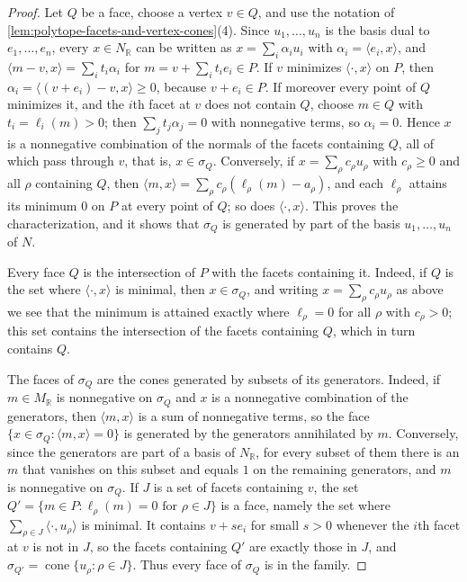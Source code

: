 \begin{proof}
Let $Q$ be a face, choose a vertex $v\in Q$, and use the notation of \cref{lem:polytope-facets-and-vertex-cones}(4). Since $u_1,\ldots,u_n$ is the basis dual to $e_1,\ldots,e_n$, every $x\in N_{\mathbb R}$ can be written as $x=\sum_i\alpha_iu_i$ with $\alpha_i=\langle e_i,x\rangle$, and $\langle m-v,x\rangle=\sum_it_i\alpha_i$ for $m=v+\sum_it_ie_i\in P$. If $v$ minimizes $\langle\cdot,x\rangle$ on $P$, then $\alpha_i=\langle(v+e_i)-v,x\rangle\geq0$, because $v+e_i\in P$. If moreover every point of $Q$ minimizes it, and the $i$th facet at $v$ does not contain $Q$, choose $m\in Q$ with $t_i=\ell_i(m)>0$; then $\sum_jt_j\alpha_j=0$ with nonnegative terms, so $\alpha_i=0$. Hence $x$ is a nonnegative combination of the normals of the facets containing $Q$, all of which pass through $v$, that is, $x\in\sigma_Q$. Conversely, if $x=\sum_\rho c_\rho u_\rho$ with $c_\rho\geq0$ and all $\rho$ containing $Q$, then $\langle m,x\rangle=\sum_\rho c_\rho(\ell_\rho(m)-a_\rho)$, and each $\ell_\rho$ attains its minimum $0$ on $P$ at every point of $Q$; so does $\langle\cdot,x\rangle$. This proves the characterization, and it shows that $\sigma_Q$ is generated by part of the basis $u_1,\ldots,u_n$ of $N$.

Every face $Q$ is the intersection of $P$ with the facets containing it. Indeed, if $Q$ is the set where $\langle\cdot,x\rangle$ is minimal, then $x\in\sigma_Q$, and writing $x=\sum_\rho c_\rho u_\rho$ as above we see that the minimum is attained exactly where $\ell_\rho=0$ for all $\rho$ with $c_\rho>0$; this set contains the intersection of the facets containing $Q$, which in turn contains $Q$.

The faces of $\sigma_Q$ are the cones generated by subsets of its generators. Indeed, if $m\in M_{\mathbb R}$ is nonnegative on $\sigma_Q$ and $x$ is a nonnegative combination of the generators, then $\langle m,x\rangle$ is a sum of nonnegative terms, so the face $\{x\in\sigma_Q:\langle m,x\rangle=0\}$ is generated by the generators annihilated by $m$. Conversely, since the generators are part of a basis of $N_{\mathbb R}$, for every subset of them there is an $m$ that vanishes on this subset and equals $1$ on the remaining generators, and $m$ is nonnegative on $\sigma_Q$. If $J$ is a set of facets containing $v$, the set $Q'=\{m\in P:\ell_\rho(m)=0\text{ for }\rho\in J\}$ is a face, namely the set where $\sum_{\rho\in J}\langle\cdot,u_\rho\rangle$ is minimal. It contains $v+se_i$ for small $s>0$ whenever the $i$th facet at $v$ is not in $J$, so the facets containing $Q'$ are exactly those in $J$, and $\sigma_{Q'}=\operatorname{cone}\{u_\rho:\rho\in J\}$. Thus every face of $\sigma_Q$ is in the family.


\end{proof}
